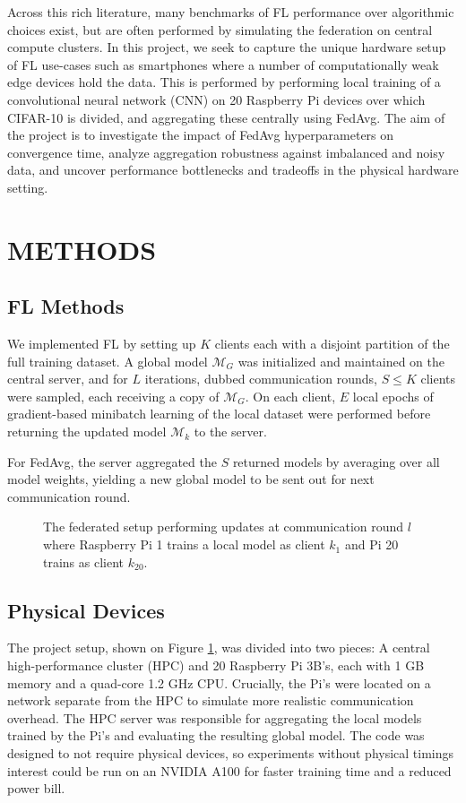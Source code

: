 \documentclass{article}
\begin{document}
Across this rich literature, many benchmarks of FL performance over algorithmic choices exist, but are often performed by simulating the federation on central compute clusters.
In this project, we seek to capture the unique hardware setup of FL use-cases such as smartphones where a number of computationally weak edge devices hold the data.
This is performed by performing local training of a convolutional neural network (CNN) on 20 Raspberry Pi devices over which CIFAR-10 \cite{alex2009learning} is divided, and aggregating these centrally using FedAvg.
The aim of the project is to investigate the impact of FedAvg hyperparameters on convergence time, analyze aggregation robustness against imbalanced and noisy data, and uncover performance bottlenecks and tradeoffs in the physical hardware setting.

\section{METHODS}%
\label{sec:methods}

\subsection{FL Methods}
We implemented FL by setting up $K$ clients each with a disjoint partition of the full training dataset.
A global model $\mathcal M_G$ was initialized and maintained on the central server, and for $L$ iterations, dubbed communication rounds, $S \leq K$ clients were sampled, each receiving a copy of $\mathcal M_G$.
On each client, $E$ local epochs of gradient-based minibatch learning of the local dataset were performed before returning the updated model $\mathcal M_k$ to the server.

For FedAvg, the server aggregated the $S$ returned models by averaging over all model weights, yielding a new global model to be sent out for next communication round.


\begin{figure}[ht!]
    \centering
    
    \caption{The federated setup performing updates at communication round $l$ where Raspberry Pi 1 trains a local model as client $k_1$ and Pi 20 trains as client $k_{20}$.}
    \label{fig:setup}
\end{figure}\noindent

\subsection{Physical Devices}
The project setup, shown on Figure \ref{fig:setup}, was divided into two pieces: A central high-performance cluster (HPC) and 20 Raspberry Pi 3B's, each with 1 GB memory and a quad-core 1.2 GHz CPU.
Crucially, the Pi's were located on a network separate from the HPC to simulate more realistic communication overhead.
The HPC server was responsible for aggregating the local models trained by the Pi's and evaluating the resulting global model.
The code was designed to not require physical devices, so experiments without physical timings interest could be run on an NVIDIA A100 for faster training time and a reduced power bill.
\end{document}

